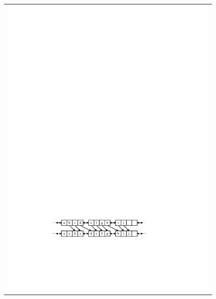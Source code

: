 \begin{figure}
	\noindent
	\begin{center}
		\begin{tabular}{@{}l@{}}
			\includegraphics[width=\ScaleIfNeeded]{figs/selist-add-a}\\[4ex]

\end{tabular}
\end{center}
\end{figure}
